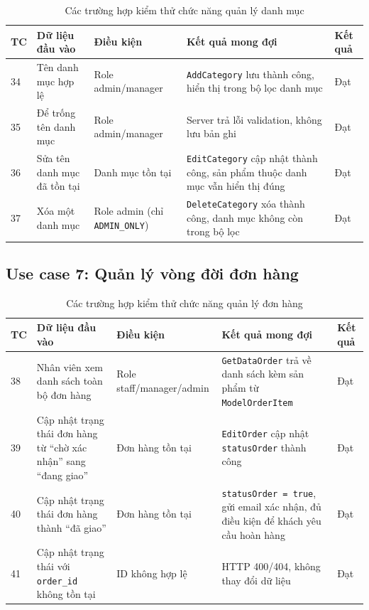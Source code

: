 \documentclass[../DoAn.tex]{subfiles}
\begin{document}
\begin{table}[H]
\centering
\caption{Các trường hợp kiểm thử chức năng quản lý danh mục}
\label{tab:test-category}
\scriptsize
\begin{tabular}{|p{0.5cm}|p{3.5cm}|p{3cm}|p{3.5cm}|p{2cm}|}
\hline
\textbf{TC} & \textbf{Dữ liệu đầu vào} & \textbf{Điều kiện} & \textbf{Kết quả mong đợi} & \textbf{Kết quả} \\
\hline
34 & Tên danh mục hợp lệ & Role admin/manager & \texttt{AddCategory} lưu thành công, hiển thị trong bộ lọc danh mục & Đạt \\
\hline
35 & Để trống tên danh mục & Role admin/manager & Server trả lỗi validation, không lưu bản ghi & Đạt \\
\hline
36 & Sửa tên danh mục đã tồn tại & Danh mục tồn tại & \texttt{EditCategory} cập nhật thành công, sản phẩm thuộc danh mục vẫn hiển thị đúng & Đạt \\
\hline
37 & Xóa một danh mục & Role admin \break (chỉ \texttt{ADMIN\_ONLY}) & \texttt{DeleteCategory} xóa thành công, danh mục không còn trong bộ lọc & Đạt \\
\hline
\end{tabular}
\end{table}

\subsection*{Use case 7: Quản lý vòng đời đơn hàng}

\begin{table}[H]
\centering
\caption{Các trường hợp kiểm thử chức năng quản lý đơn hàng}
\label{tab:test-order}
\scriptsize
\begin{tabular}{|p{0.5cm}|p{3.5cm}|p{3cm}|p{3.5cm}|p{2cm}|}
\hline
\textbf{TC} & \textbf{Dữ liệu đầu vào} & \textbf{Điều kiện} & \textbf{Kết quả mong đợi} & \textbf{Kết quả} \\
\hline
38 & Nhân viên xem danh sách toàn bộ đơn hàng & Role staff/manager/admin & \texttt{GetDataOrder} trả về danh sách kèm sản phẩm từ \texttt{ModelOrderItem} & Đạt \\
\hline
39 & Cập nhật trạng thái đơn hàng từ ``chờ xác nhận'' sang ``đang giao'' & Đơn hàng tồn tại & \texttt{EditOrder} cập nhật \break \texttt{statusOrder} thành công & Đạt \\
\hline
40 & Cập nhật trạng thái đơn hàng thành ``đã giao'' & Đơn hàng tồn tại & \texttt{statusOrder = true}, gửi email xác nhận, đủ điều kiện để khách yêu cầu hoàn hàng & Đạt \\
\hline
41 & Cập nhật trạng thái với \break \texttt{order\_id} không tồn tại & ID không hợp lệ & HTTP 400/404, không thay đổi dữ liệu & Đạt \\
\hline
\end{tabular}
\end{table}
\end{document}
